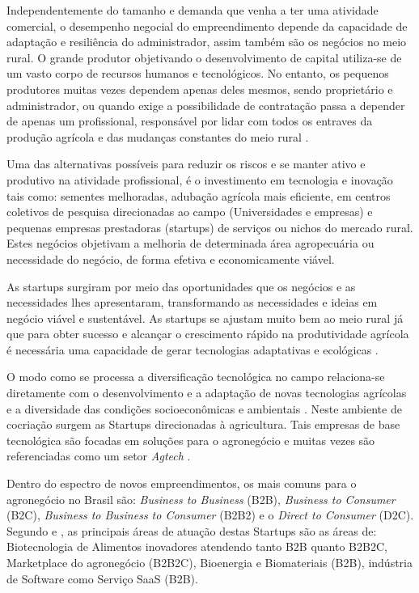 Independentemente do tamanho e demanda que venha a ter uma atividade comercial, o desempenho negocial do empreendimento depende da capacidade de adaptação e resiliência do administrador, assim também são os negócios no meio rural. O grande produtor objetivando o desenvolvimento de capital utiliza-se de um vasto corpo de recursos humanos e tecnológicos. No entanto, os pequenos produtores muitas vezes dependem apenas deles mesmos, sendo proprietário e administrador, ou quando exige a possibilidade de contratação passa a depender de apenas um profissional, responsável por lidar com todos os entraves da produção agrícola e das mudanças constantes do meio rural \cite{soares_relacao_2017}. 

Uma das alternativas possíveis para reduzir os riscos e se manter ativo e produtivo na atividade profissional, é o investimento em tecnologia e inovação tais como: sementes melhoradas, adubação agrícola mais eficiente, em centros coletivos de pesquisa direcionadas ao campo (Universidades e empresas) \cite{bochi_dorneles_coletivos_2014, gomes_inovacao_2014} e pequenas empresas prestadoras (startups) de serviços ou nichos do mercado rural. Estes negócios objetivam a melhoria de determinada área agropecuária \cite{junior_agtechs:_2019} ou necessidade do negócio, de forma efetiva e economicamente viável. 

As startups surgiram por meio das oportunidades que os negócios e as necessidades lhes apresentaram, transformando as necessidades e ideias em negócio viável e sustentável. As startups se ajustam muito bem ao meio rural já que para obter sucesso e alcançar o crescimento rápido na produtividade agrícola é necessária uma capacidade de gerar tecnologias adaptativas e ecológicas \cite{contini_hayami_2019}.

O modo como se processa a diversificação tecnológica no campo relaciona-se diretamente com o desenvolvimento e a adaptação de novas tecnologias agrícolas e a diversidade das condições socioeconômicas e ambientais \cite{fen-azmeyer_o_2019}. Neste ambiente de cocriação surgem as Startups direcionadas à agricultura. Tais empresas de base tecnológica são focadas em soluções para o agronegócio e muitas vezes são referenciadas como um setor \textit{Agtech} \cite{blanco_agtechs:_2019}.

Dentro do espectro de novos empreendimentos, os mais comuns para o agronegócio no Brasil são: \textit{Business to Business} (B2B), \textit{Business to Consumer} (B2C), \textit{Business to Business to Consumer} (B2B2) e o \textit{Direct to Consumer} (D2C). Segundo  e \cite{abstartups_startupbase_2019}, as principais  áreas de atuação destas Startups são as áreas de: Biotecnologia de Alimentos inovadores atendendo tanto B2B quanto B2B2C, Marketplace do agronegócio (B2B2C), Bioenergia e Biomateriais (B2B), indústria de Software como Serviço SaaS (B2B).


